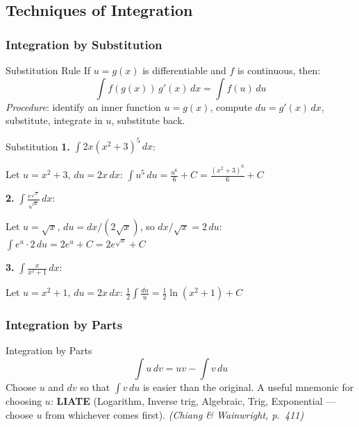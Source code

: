 \documentclass[12pt, a4paper]{article}
\theoremstyle{definition}
\newcommand{\dd}[1]{\,d#1}
\begin{document}
\subsection{Techniques of Integration}

\subsubsection*{Integration by Substitution}

\begin{thmbox}{Substitution Rule}
If $u = g(x)$ is differentiable and $f$ is continuous, then:
\[
  \int f(g(x))\,g'(x)\dd{x} = \int f(u)\dd{u}
\]
\emph{Procedure}: identify an inner function $u=g(x)$, compute $du=g'(x)\,dx$,
substitute, integrate in $u$, substitute back.
\end{thmbox}

\begin{exbox}{Substitution}
\textbf{1.} $\displaystyle\int 2x(x^2+3)^5\dd{x}$:

Let $u = x^2+3$, $du = 2x\,dx$:
$\displaystyle\int u^5\dd{u} = \frac{u^6}{6} + C = \frac{(x^2+3)^6}{6} + C$

\textbf{2.} $\displaystyle\int \frac{e^{\sqrt{x}}}{\sqrt{x}}\dd{x}$:

Let $u=\sqrt{x}$, $du = dx/(2\sqrt{x})$, so $dx/\sqrt{x} = 2\,du$:
$\displaystyle\int e^u\cdot 2\dd{u} = 2e^u + C = 2e^{\sqrt{x}} + C$

\textbf{3.} $\displaystyle\int \frac{x}{x^2+1}\dd{x}$:

Let $u=x^2+1$, $du=2x\,dx$:
$\displaystyle\frac{1}{2}\int\frac{du}{u} = \frac{1}{2}\ln(x^2+1) + C$
\end{exbox}

\subsubsection*{Integration by Parts}

\begin{thmbox}{Integration by Parts}
\[
  \int u\,dv = uv - \int v\,du
\]
Choose $u$ and $dv$ so that $\int v\,du$ is easier than the original.
A useful mnemonic for choosing $u$: \textbf{LIATE} (Logarithm, Inverse trig,
Algebraic, Trig, Exponential --- choose $u$ from whichever comes first).
\emph{(Chiang \& Wainwright, p.\ 411)}
\end{thmbox}
\end{document}
